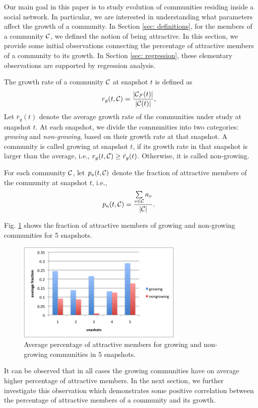 Our main goal in this paper is to study evolution of communities residing inside a social network. In particular, we are interested in understanding what parameters affect the growth of a community. In Section \ref{sec: definitions}, 
for the members of a community $\mathcal{C}$, we defined the notion of being attractive. In this section, we provide some initial observations connecting the percentage of attractive members of a community to its growth. In Section \ref{sec: regression},  these elementary observations are supported by  regression analysis. 


The growth rate of a community $\mathcal{C}$ at snapshot $t$ is defined as
\begin{align}
r_g(t,\mathcal{C}) = \frac{|\mathcal{C}_{\mathcal{F}}(t)|}{|\mathcal{C}(t)|},
\end{align}
Let $\bar{r}_g(t)$ denote the average growth rate of the communities under study at snapshot $t$. At each snapshot, we divide the communities into two categories: \emph{growing} and \emph{non-growing}, based on their growth rate at that snapshot.  A community is called growing at snapshot $t$, if its growth rate in that snapshot is larger than the average, i.e., $r_g(t,\mathcal{C}) \geq \bar{r}_g(t)$. Otherwise, it is called non-growing.  

For each community $\mathcal{C}$, let $p_a(t,\mathcal{C})$ denote the fraction of attractive members of the community at snapshot $t$, i.e.,
\begin{align}
p_a(t,\mathcal{C}) = \frac{\sum\limits_{v\in\mathcal{C}} a_v}{|\mathcal{C}|}.
\end{align}

Fig. \ref{fig: perc_att} shows the fraction of attractive members of growing and non-growing communities for 5 snapshots. 
\begin{figure}
\begin{center}
\includegraphics[width=80mm]{../figures/att_growth.png}\caption{Average percentage of attractive members for  growing and non-growing communities in 5 snapshots.}\label{fig: perc_att}
\end{center}
\end{figure}
It can be observed that in all cases the growing communities have on average higher percentage of attractive members. In the next section, we further investigate this observation which demonstrates  some positive correlation between the percentage of  attractive members of a community and its growth.
 



